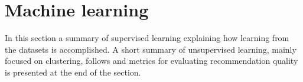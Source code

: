 \section{Machine learning}

In this section a summary of supervised learning explaining how learning from the datasets is accomplished. A short summary of unsupervised learning, mainly focused on clustering, follows and metrics for evaluating recommendation quality is presented at the end of the section.





\newpage



